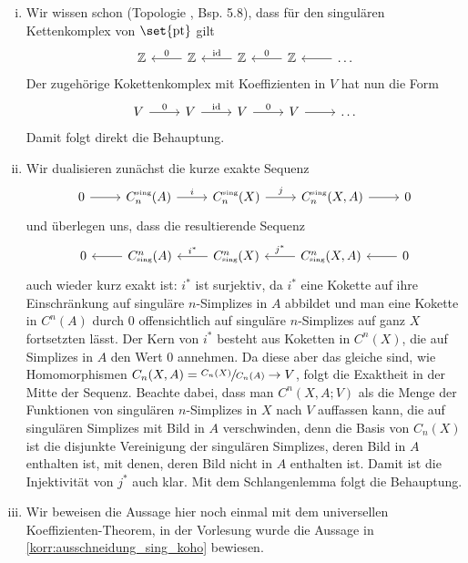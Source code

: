 \begin{beweis}[name={\cite[S. 199 ff]{Hatcher}}]
	\leavevmode
	\begin{enumerate}[(i)]
		\item Wir wissen schon (Topologie , Bsp. 5.8), dass für den singulären Kettenkomplex von $\set{\pt}$ gilt
		\[
			\begin{tikzcd}
				\mathbb{Z} & \mathbb{Z} \lar["0"'] & \mathbb{Z} \lar["\id"'] & \mathbb{Z} \lar["0"'] & \ldots \lar 
			\end{tikzcd}
		\]
		Der zugehörige Kokettenkomplex mit Koeffizienten in $V$ hat nun die Form
		\[
			\begin{tikzcd}
				V \rar["0"] & V \rar["\id"] & V \rar["0"] & V \rar & \ldots 
			\end{tikzcd}
		\]
		Damit folgt direkt die Behauptung.
		\item Wir dualisieren zunächst die kurze exakte Sequenz 
		\[
			\begin{tikzcd}
				0 \rar & C_n^\sing(A) \rar["i"] & C_n^\sing (X) \rar["j"] & C_n^\sing(X,A) \rar & 0
			\end{tikzcd}
		\]
		und überlegen uns, dass die resultierende Sequenz
		\[
			\begin{tikzcd}
				0 & C^n_\sing(A) \lar & C^n_\sing(X) \lar["i^*"'] & C^n_\sing(X,A) \lar["j^*"'] & 0 \lar
			\end{tikzcd}
		\]
		auch wieder kurz exakt ist:
		$i^*$ ist surjektiv, da $i^*$ eine Kokette auf ihre Einschränkung auf singuläre $n$-Simplizes in $A$ abbildet und man eine Kokette in $C^n(A)$ durch $0$ offensichtlich auf singuläre $n$-Simplizes auf ganz $X$ fortsetzten lässt.
		Der Kern von $i^*$ besteht aus Koketten in $C^n(X)$, die auf Simplizes in $A$ den Wert $0$ annehmen.
		Da diese aber das gleiche sind, wie Homomorphismen $C_n(X,A) = \sfrac{C_n(X)}{C_n(A)}\to V$, folgt die Exaktheit in der Mitte der Sequenz. Beachte dabei, dass man $C^n(X,A;V)$ als die Menge der Funktionen von singulären $n$-Simplizes in $X$ nach $V$ auffassen kann, die auf singulären Simplizes mit Bild in $A$ verschwinden, denn die Basis von $C_n(X)$ ist die disjunkte Vereinigung der singulären Simplizes, deren Bild in $A$ enthalten ist, mit denen, deren Bild nicht in $A$ enthalten ist.
		Damit ist die Injektivität von $j^*$ auch klar. 
		Mit dem Schlangenlemma folgt die Behauptung.
		\item Wir beweisen die Aussage hier noch einmal mit dem universellen Koeffizienten-Theorem, in der Vorlesung wurde die Aussage in \autoref{korr:ausschneidung_sing_koho} bewiesen.
		

\end{enumerate}
\end{beweis}

